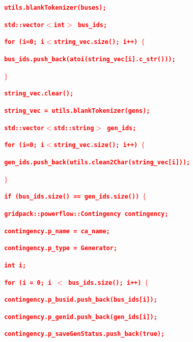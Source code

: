 \documentclass[12pt]{report} %
\begin{document}
\textcolor{red}{\texttt{\textbf{          utils.blankTokenizer(buses);}}}

\textcolor{red}{\texttt{\textbf{      std::vector$\boldsymbol{\mathrm{<}}$int$\boldsymbol{\mathrm{>}}$ bus\_ids;}}}

\textcolor{red}{\texttt{\textbf{      for (i=0; i$\boldsymbol{\mathrm{<}}$string\_vec.size(); i++) $\boldsymbol{\mathrm{\{}}$}}}

\textcolor{red}{\texttt{\textbf{        bus\_ids.push\_back(atoi(string\_vec[i].c\_str()));}}}

\textcolor{red}{\texttt{\textbf{      $\boldsymbol{\mathrm{\}}}$}}}

\textcolor{red}{\texttt{\textbf{      string\_vec.clear();}}}

\textcolor{red}{\texttt{\textbf{      string\_vec = utils.blankTokenizer(gens);}}}

\textcolor{red}{\texttt{\textbf{      std::vector$\boldsymbol{\mathrm{<}}$std::string$\boldsymbol{\mathrm{>}}$ gen\_ids;}}}

\textcolor{red}{\texttt{\textbf{      for (i=0; i$\boldsymbol{\mathrm{<}}$string\_vec.size(); i++) $\boldsymbol{\mathrm{\{}}$}}}

\textcolor{red}{\texttt{\textbf{        gen\_ids.push\_back(utils.clean2Char(string\_vec[i]));}}}

\textcolor{red}{\texttt{\textbf{      $\boldsymbol{\mathrm{\}}}$}}}

\textcolor{red}{\texttt{\textbf{      if (bus\_ids.size() == gen\_ids.size()) $\boldsymbol{\mathrm{\{}}$}}}

\textcolor{red}{\texttt{\textbf{        gridpack::powerflow::Contingency contingency;}}}

\textcolor{red}{\texttt{\textbf{        contingency.p\_name = ca\_name;}}}

\textcolor{red}{\texttt{\textbf{        contingency.p\_type = Generator;}}}

\textcolor{red}{\texttt{\textbf{        int i;}}}

\textcolor{red}{\texttt{\textbf{        for (i = 0; i $\boldsymbol{\mathrm{<}}$ bus\_ids.size(); i++) $\boldsymbol{\mathrm{\{}}$}}}

\textcolor{red}{\texttt{\textbf{          contingency.p\_busid.push\_back(bus\_ids[i]);}}}

\textcolor{red}{\texttt{\textbf{          contingency.p\_genid.push\_back(gen\_ids[i]);}}}

\textcolor{red}{\texttt{\textbf{          contingency.p\_saveGenStatus.push\_back(true);}}}
\end{document}
